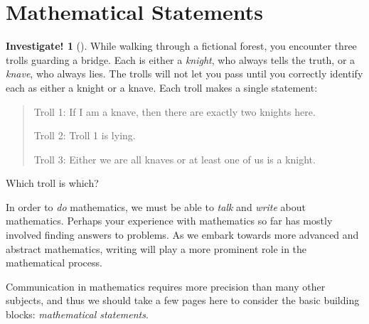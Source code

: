 \documentclass[10pt,]{book}
\theoremstyle{plain}
\theoremstyle{definition}
\theoremstyle{definition}
\theoremstyle{definition}
\newtheorem{investigation}[project]{Investigate!}
\theoremstyle{definition}
\numberwithin{equation}{chapter}
\begin{document}
\section[{Mathematical Statements}]{Mathematical Statements}\label{sec_background-statements}
\begin{investigation}[]\label{investigation-10}
\hypertarget{p-1240}{}%
While walking through a fictional forest, you encounter three trolls guarding a bridge. Each is either a \emph{knight}, who always tells the truth, or a \emph{knave}, who always lies. The trolls will not let you pass until you correctly identify each as either a knight or a knave. Each troll makes a single statement:%
\begin{quote}\hypertarget{blockquote-3}{}
\hypertarget{p-1241}{}%
Troll 1: If I am a knave, then there are exactly two knights here.%
\par
\hypertarget{p-1242}{}%
Troll 2: Troll 1 is lying.%
\par
\hypertarget{p-1243}{}%
Troll 3: Either we are all knaves or at least one of us is a knight.%
\end{quote}
\hypertarget{p-1244}{}%
Which troll is which?  %
\end{investigation}
\hypertarget{p-1245}{}%
In order to \emph{do} mathematics, we must be able to \emph{talk} and \emph{write} about mathematics. Perhaps your experience with mathematics so far has mostly involved finding answers to problems. As we embark towards more advanced and abstract mathematics, writing will play a more prominent role in the mathematical process.%
\par
\hypertarget{p-1246}{}%
Communication in mathematics requires more precision than many other subjects, and thus we should take a few pages here to consider the basic building blocks: \emph{mathematical statements}.%
\typeout{************************************************}
\typeout{************************************************}
\end{document}
